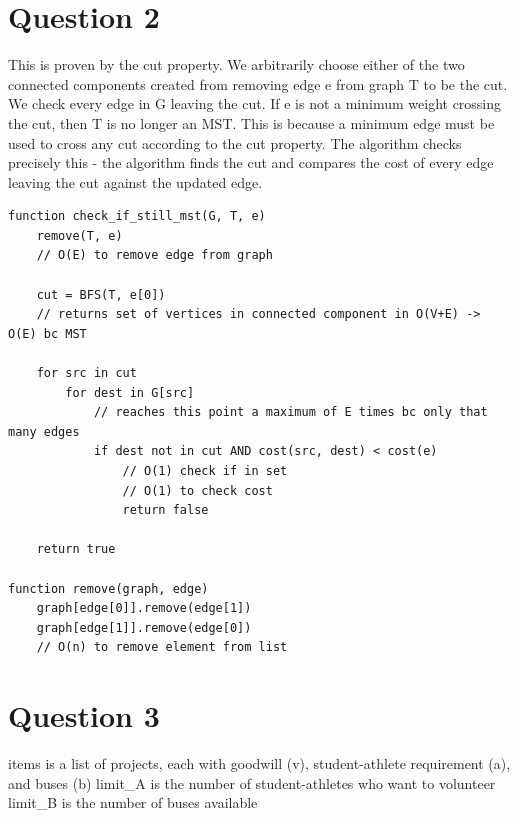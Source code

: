 \documentclass[11pt, oneside]{article}
\begin{document}
\section{Question 2}

This is proven by the cut property. We arbitrarily choose either of the two connected components created from removing edge e from graph T to be the cut. We check every edge in G leaving the cut. If e is not a minimum weight crossing the cut, then T is no longer an MST. This is because a minimum edge must be used to cross any cut according to the cut property. The algorithm checks precisely this - the algorithm finds the cut and compares the cost of every edge leaving the cut against the updated edge. \newline

\begin{lstlisting}
function check_if_still_mst(G, T, e)
    remove(T, e)
    // O(E) to remove edge from graph

    cut = BFS(T, e[0])
    // returns set of vertices in connected component in O(V+E) -> O(E) bc MST

    for src in cut
        for dest in G[src]
            // reaches this point a maximum of E times bc only that many edges
            if dest not in cut AND cost(src, dest) < cost(e) 
                // O(1) check if in set
                // O(1) to check cost
                return false

    return true

function remove(graph, edge)
    graph[edge[0]].remove(edge[1])
    graph[edge[1]].remove(edge[0])
    // O(n) to remove element from list
\end{lstlisting}


\clearpage

\section{Question 3}

items is a list of projects, each with goodwill (v), student-athlete requirement (a), and buses (b) \newline
limit\_A is the number of student-athletes who want to volunteer \newline
limit\_B is the number of buses available \newline
\end{document}
